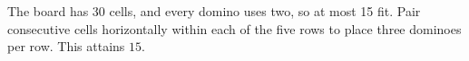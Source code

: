 The board has 30 cells, and every domino uses two, so at most 15 fit. Pair consecutive cells horizontally within each of the five rows to place three dominoes per row. This attains $\boxed{15}$.
